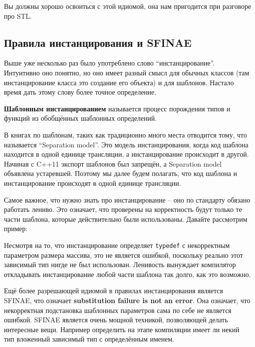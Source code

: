 \documentclass[a4paper,12pt,oneside]{article}
\begin{document}
Вы должны хорошо освоиться с этой идиомой, она нам пригодится при разговоре про STL.

\subsection{Правила инстанцирования и SFINAE}

Выше уже несколько раз было употреблено слово ``инстанцирование''. Интуитивно оно понятно, но оно имеет разный смысл для обычных классов (там инстанцирование класса это создание его объекта) и для шаблонов. Настало время дать этому слову более точное определение.

\textbf{Шаблонным инстанцированием} называется процесс порождения типов и функций из обобщённых шаблонных определений.

В книгах по шаблонам, таких как \cite{vandervoord} традиционно много места отводится тому, что называется ``Separation model''. Это модель инстанцирования, когда код шаблона находится в одной единице трансляции, а инстанцирование происходит в другой. Начиная с C++11 \cite{stdcpp11} экспорт шаблонов был запрещён, а Separation model объявлена устаревшей. Поэтому мы далее будем полагать, что код шаблона и инстанцирование происходят в одной единице трансляции.

Самое важное, что нужно знать про инстанцирование -- оно по стандарту обязано работать лениво. Это означает, что проверены на корректность будут только те части шаблона, которые действительно были использованы. Давайте рассмотрим пример:



Несмотря на то, что инстанцирование определяет \lstinline!typedef! с некорректным параметром размера массива, это не является ошибкой, поскольку реально этот зависимый тип нигде не был использован. Ленивость вынуждает компилятор откладывать инстанцирование любой части шаблона так долго, как это возможно.

Ещё более разрешающей идиомой в правилах инстанцирования является SFINAE, что означает \textbf{substitution failure is not an error}. Она означает, что некорректная подстановка шаблонных параметров сама по себе не является ошибкой. SFINAE является очень мощной техникой, позволяющей делать интересные вещи. Например определить на этапе компиляции имеет ли некий тип вложенный зависимый тип с определённым именем.


\end{document}
